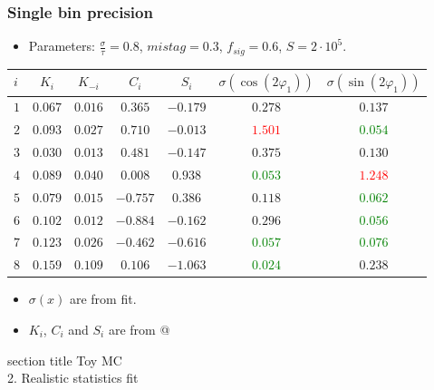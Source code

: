 \documentclass[10 pt,compress,mathserif]{beamer}
\begin{document}
\begin{frame}[containsverbatim]
 \frametitle{Single bin precision}
 \begin{itemize}
  \item Parameters: $\frac{\sigma}{\tau}=0.8$, $mistag = 0.3$, $f_{sig} = 0.6$, $S = 2\cdot10^5$.
 \end{itemize}
 \begin{table}[bt]
 \small
\begin{tabular}{|l|c|c|c|c|c|c|} \hline
$i$ & $K_{i}$ & $K_{-i}$ & $C_i$ & $S_i$ & $\sigma\left({\cos(2\varphi_1)}\right)$ & $\sigma\left({\sin(2\varphi_1)}\right)$ \\ \hline
$1$ & $0.067$ & $0.016$ & $0.365$ & $-0.179$ & $0.278$ & $0.137$ \\ \hline
$2$ & $0.093$ & $0.027$ & $0.710$ & $-0.013$ & \textcolor{red}{$1.501$} & \textcolor{green}{$0.054$} \\ \hline
$3$ & $0.030$ & $0.013$ & $0.481$ & $-0.147$ & $0.375$ & $0.130$ \\ \hline
$4$ & $0.089$ & $0.040$ & $0.008$ & $0.938$ & \textcolor{green}{$0.053$} & \textcolor{red}{$1.248$} \\ \hline
$5$ & $0.079$ & $0.015$ & $-0.757$ & $0.386$ & $0.118$ & \textcolor{green}{$0.062$} \\ \hline
$6$ & $0.102$ & $0.012$ & $-0.884$ & $-0.162$ & $0.296$ & \textcolor{green}{$0.056$} \\ \hline
$7$ & $0.123$ & $0.026$ & $-0.462$ & $-0.616$ & \textcolor{green}{$0.057$} & \textcolor{green}{$0.076$} \\ \hline
$8$ & $0.159$ & $0.109$ & $0.106$ & $-1.063$ & \textcolor{green}{$0.024$} & $0.238$ \\ \hline
\end{tabular}
\end{table}

 \begin{itemize}
  \item $\sigma(x)$ are from fit.
  \item $K_i$, $C_i$ and $S_i$ are from @
 \end{itemize}
\end{frame}

\begin{frame}
 \centering
    \begin{beamercolorbox}[sep=8pt,center]{section title}
       Toy MC\\ 2. Realistic statistics fit
    \end{beamercolorbox}
\end{frame}
\end{document}
